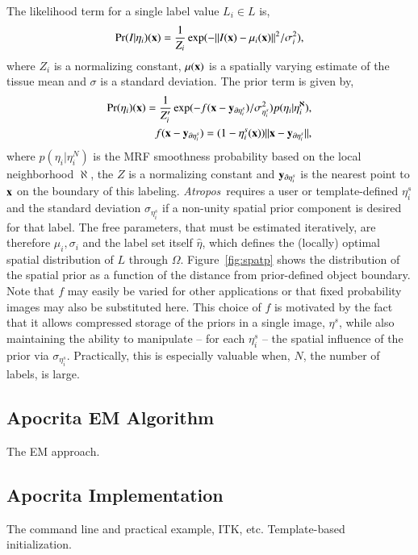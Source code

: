 \documentclass[preprint,authoryear,12pt]{elsarticle}
\newcommand{\x}{{\bf x}}
\newcommand{\y}{{\bf y}}
\newcommand {\alg}{{\em Atropos}}
\begin{document}
The likelihood term for a single label value $L_i \in L$ is,
\begin{eqnarray} \Pr( I | \eta_i )(\x)=\frac{1}{Z_i} \exp(- \| I(\x) -
\mu_i(\x) \|^2 / \sigma_i^2 ),
\end{eqnarray} where $Z_i$ is a normalizing constant, $\mu(\x)$ is a
spatially varying estimate of the tissue mean and $\sigma$ is a
standard deviation.  The prior term is given by,
\begin{eqnarray} \Pr(\eta_i)(\x) = \frac{1}{Z^\prime_i} \exp( -f( \x -
\y_{\partial \eta^s_i} ) / \sigma_{\eta^s_i}^2 ) p(\eta_i |
\eta^\aleph_i), \\ \notag f( \x - \y_{\partial \eta^s_i} ) = (1 -
\eta^s_i (\x) ) \| \x - \y_{\partial \eta^s_i} \|,
\end{eqnarray} where $p(\eta_i | \eta^N_i)$ is the MRF smoothness
probability based on the local neighborhood $\aleph$, the $Z$ is a
normalizing constant and $\y_{\partial \eta^s_i}$ is the nearest point
to $\x$ on the boundary of this labeling. \alg~requires a user or
template-defined $\eta^s_i$ and the standard deviation
$\sigma_{\eta^s_i}$ if a non-unity spatial prior component is desired
for that label.  The free parameters, that must be estimated
iteratively, are therefore $\mu_i, \sigma_i$ and the label set itself
$\hat \eta$, which defines the (locally) optimal spatial distribution
of $L$ through $\Omega$.  Figure~\ref{fig:spatp} shows the
distribution of the spatial prior as a function of the distance from
prior-defined object boundary.  Note that $f$ may easily be varied for
other applications or that fixed probability images may also be
substituted here.  This choice of $f$ is motivated by the fact that it
allows compressed storage of the priors in a single image, $\eta^s$,
while also maintaining the ability to manipulate -- for each
$\eta^s_i$ -- the spatial influence of the prior via
$\sigma_{\eta^s_i}$.  Practically, this is especially valuable when,
$N$, the number of labels, is large.

\subsection{Apocrita EM Algorithm}
The EM approach. 

\subsection{Apocrita Implementation}
The command line and practical example, ITK, etc. 
Template-based initialization.  
\end{document}
